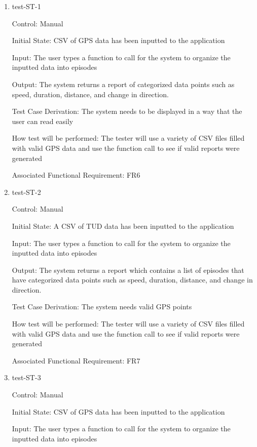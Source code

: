 \documentclass[12pt, titlepage]{article}
\begin{document}
\begin{enumerate}

\item{test-ST-1\\}

Control: Manual       
					
Initial State: CSV of GPS data has been inputted to the application
					
Input: The user types a function to call for the system to organize the inputted data into episodes 
					
Output: The system returns a report of categorized data points such as speed, duration, distance, and change in direction.

Test Case Derivation: The system needs to be displayed in a way that the user can read easily

How test will be performed: The tester will use a variety of CSV files filled with valid GPS data and use the function call to see if valid reports were generated


Associated Functional Requirement: FR6



\item{test-ST-2\\}

Control: Manual
					
Initial State: A CSV of TUD data has been inputted to the application
					
Input: The user types a function to call for the system to organize the inputted data into episodes 
					
Output: The system returns a report which contains a list of episodes that have categorized data points such as speed, duration, distance, and change in direction.

Test Case Derivation: The system needs valid GPS points

How test will be performed: The tester will use a variety of CSV files filled with valid GPS data and use the function call to see if valid reports were generated


Associated Functional Requirement: FR7

\item{test-ST-3\\}

Control: Manual
					
Initial State: CSV of GPS data has been inputted to the application
					
Input: The user types a function to call for the system to organize the inputted data into episodes 
					

\end{enumerate}
\end{document}
